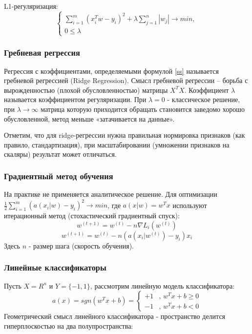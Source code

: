 L1-регуляризация:
\begin{equation*}
 \begin{cases}
   \sum\limits_{i=1}^m (x_i^Tw - y_i)^2 + \lambda \sum\limits_{j=1}^n |w_j| \rightarrow min,
   \\
   0 \leq \lambda
\end{cases}
\end{equation*}

\subsubsection{Гребневая регрессия}
Регрессия с коэффициентами, определяемыми формулой \ref{ss} называется гребневой регрессией (Ridge Regression). Смысл гребневой регрессии – борьба с вырожденностью (плохой обусловленностью) матрицы $X^TX$. Коэффициент $\lambda$ называется коэффициентом регуляризации. При $\lambda = 0$ - классическое решение, при
$\lambda \rightarrow \infty$ матрица которую приходится обращать становится заведомо хорошо обусловленной, метод меньше «затачивается на данные».

Отметим, что для ridge-регрессии нужна правильная нормировка признаков
(как правило, стандартизация), при масштабировании (умножении признаков на
скаляры) результат может отличаться.

\subsubsection{Градиентный метод обучения}
На практике не применяется аналитическое решение. Для оптимизации $\frac{1}{2} \sum\limits_{i=1}^m (a(x_i|w) - y_i)^2 \rightarrow min$, где $a(x|w) = w^Tx$ используют итерационный метод (стохастический градиентный спуск):
\begin{equation}
w^{(t+1)} = w^{(t)} - n\nabla L_i(w^{(t)})
\end{equation}
\begin{equation}
w^{(t+1)} = w^{(t)} - n(a(x_i|w^{(t)}) - y_i)x_i
\end{equation}
Здесь $n$ - размер шага (скорость обучения).

\subsubsection{Линейные классификаторы}
Пусть $X= R^n$ и $Y = \{-1, 1\}$, рассмотрим линейную модель классификатора:
\begin{equation*}
a(x) = sgn(w^Tx + b) =
 \begin{cases}
   +1 &\text{, $w^Tx + b \geq 0$}\\
   -1 &\text{, $w^Tx + b < 0$}
 \end{cases}
\end{equation*}
Геометрический смысл линейного классификатора - пространство делится гиперплоскостью на два полупространства:

